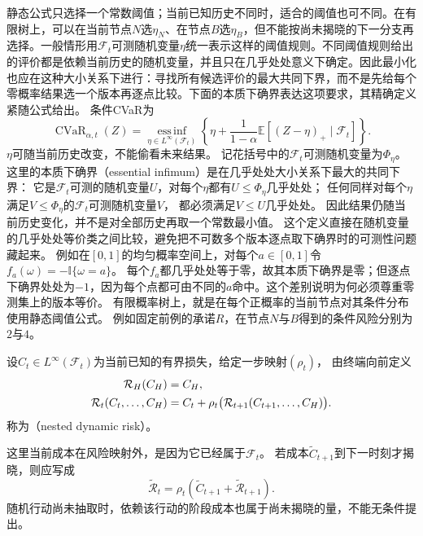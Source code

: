 静态公式只选择一个常数阈值；当前已知历史不同时，适合的阈值也可不同。在有限树上，可以在当前节点$N$选$\eta_N$、在节点$B$选$\eta_B$，但不能按尚未揭晓的下一分支再选择。一般情形用$\mathcal F_t$可测随机变量$\eta$统一表示这样的阈值规则。不同阈值规则给出的评价都是依赖当前历史的随机变量，并且只在几乎处处意义下确定。因此最小化也应在这种大小关系下进行：寻找所有候选评价的最大共同下界，而不是先给每个零概率结果选一个版本再逐点比较。下面的本质下确界表达这项要求，其精确定义紧随公式给出。
条件CVaR为
\begin{equation}
  \operatorname{CVaR}_{\alpha,t}(Z)
  =\operatorname*{ess\,inf}_{\eta\in L^\infty(\mathcal F_t)}
    \left\{\eta+\frac{1}{1-\alpha}
      \mathbb E[(Z-\eta)_+\mid\mathcal F_t]\right\}.
  \label{eq:decision-conditional-cvar}
\end{equation}
$\eta$可随当前历史改变，不能偷看未来结果。
记花括号中的$\mathcal F_t$可测随机变量为$\Phi_\eta$。
这里的本质下确界（essential infimum）是在几乎处处大小关系下最大的共同下界：
它是$\mathcal F_t$可测的随机变量$U$，对每个$\eta$都有$U\leq\Phi_\eta$几乎处处；
任何同样对每个$\eta$满足$V\leq\Phi_\eta$的$\mathcal F_t$可测随机变量$V$，
都必须满足$V\leq U$几乎处处。
因此结果仍随当前历史变化，并不是对全部历史再取一个常数最小值。
这个定义直接在随机变量的几乎处处等价类之间比较，避免把不可数多个版本逐点取下确界时的可测性问题藏起来。
例如在$[0,1]$的均匀概率空间上，对每个$a\in[0,1]$令$f_a(\omega)=-\mathbb I\{\omega=a\}$。
每个$f_a$都几乎处处等于零，故其本质下确界是零；但逐点下确界处处为$-1$，因为每个点都可由不同的$a$命中。这个差别说明为何必须尊重零测集上的版本等价。
有限概率树上，就是在每个正概率的当前节点对其条件分布使用静态阈值公式。
例如固定前例的承诺$R$，在节点$N$与$B$得到的条件风险分别为$2$与$4$。

\begin{definition}[嵌套动态风险]
\label{def:decision-nested-dynamic-risk}
设$C_t\in L^\infty(\mathcal F_t)$为当前已知的有界损失，给定一步映射$(\rho_t)$，
由终端向前定义
\begin{align}
  \mathcal R_H(C_H)&=C_H,\notag\\
  \mathcal R_t(C_t,\ldots,C_H)
  &=C_t+\rho_t\bigl(\mathcal R_{t+1}(C_{t+1},\ldots,C_H)\bigr).
  \label{eq:decision-nested-dynamic-risk}
\end{align}
称为（nested dynamic risk）。
\end{definition}
这里当前成本在风险映射外，是因为它已经属于$\mathcal F_t$。
若成本$\widetilde C_{t+1}$到下一时刻才揭晓，则应写成
\[
  \widetilde{\mathcal R}_t
  =\rho_t(\widetilde C_{t+1}+\widetilde{\mathcal R}_{t+1}).
\]
随机行动尚未抽取时，依赖该行动的阶段成本也属于尚未揭晓的量，不能无条件提出。

